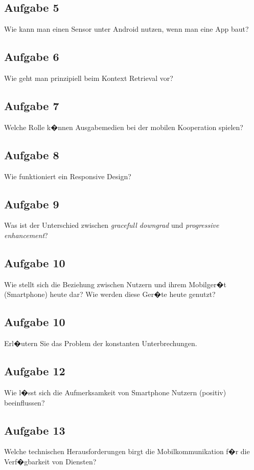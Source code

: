 \subsection*{Aufgabe 5} 
Wie kann man einen Sensor unter Android nutzen, wenn man eine App baut?

\subsection*{Aufgabe 6} 
Wie geht man prinzipiell beim Kontext Retrieval vor?

\subsection*{Aufgabe 7} 
Welche Rolle k�nnen Ausgabemedien bei der mobilen Kooperation spielen?

\subsection*{Aufgabe 8} 
Wie funktioniert ein Responsive Design?

 
\subsection*{Aufgabe 9} 
Was ist der Unterschied zwischen \textit{gracefull downgrad} und \textit{progressive enhancement}?

\subsection*{Aufgabe 10} 
Wie stellt sich die Beziehung zwischen Nutzern und ihrem Mobilger�t (Smartphone) heute dar? Wie werden diese Ger�te heute genutzt?

\subsection*{Aufgabe 10} 
Erl�utern Sie das Problem der konstanten Unterbrechungen.

\subsection*{Aufgabe 12} 
Wie l�sst sich die Aufmerksamkeit von Smartphone Nutzern (positiv) beeinflussen?

\subsection*{Aufgabe 13} 
Welche technischen Herausforderungen birgt die Mobilkommunikation f�r die Verf�gbarkeit von Diensten?

